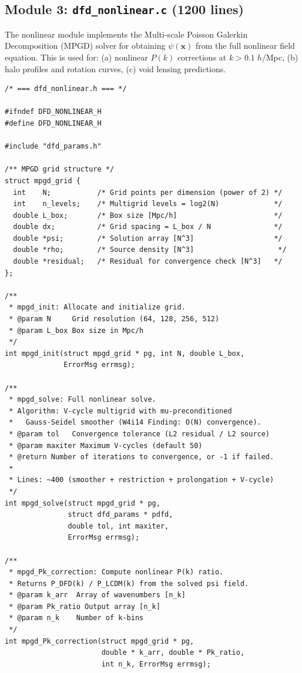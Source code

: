 \documentclass[11pt]{article}
\theoremstyle{definition}
\theoremstyle{remark}
\begin{document}
\subsection{Module 3: \texttt{dfd\_nonlinear.c} (1200 lines)}

The nonlinear module implements the Multi-scale Poisson Galerkin
Decomposition (MPGD) solver for obtaining $\psi(\mathbf{x})$ from
the full nonlinear field equation. This is used for:
(a) nonlinear $P(k)$ corrections at $k > 0.1\;h/$Mpc,
(b) halo profiles and rotation curves,
(c) void lensing predictions.

\begin{lstlisting}[caption={Module 3: Key function signatures}]
/* === dfd_nonlinear.h === */

#ifndef DFD_NONLINEAR_H
#define DFD_NONLINEAR_H

#include "dfd_params.h"

/** MPGD grid structure */
struct mpgd_grid {
  int    N;           /* Grid points per dimension (power of 2) */
  int    n_levels;    /* Multigrid levels = log2(N)             */
  double L_box;       /* Box size [Mpc/h]                       */
  double dx;          /* Grid spacing = L_box / N               */
  double *psi;        /* Solution array [N^3]                   */
  double *rho;        /* Source density [N^3]                    */
  double *residual;   /* Residual for convergence check [N^3]   */
};

/**
 * mpgd_init: Allocate and initialize grid.
 * @param N     Grid resolution (64, 128, 256, 512)
 * @param L_box Box size in Mpc/h
 */
int mpgd_init(struct mpgd_grid * pg, int N, double L_box,
              ErrorMsg errmsg);

/**
 * mpgd_solve: Full nonlinear solve.
 * Algorithm: V-cycle multigrid with mu-preconditioned
 *   Gauss-Seidel smoother (W4i14 Finding: O(N) convergence).
 * @param tol   Convergence tolerance (L2 residual / L2 source)
 * @param maxiter Maximum V-cycles (default 50)
 * @return Number of iterations to convergence, or -1 if failed.
 *
 * Lines: ~400 (smoother + restriction + prolongation + V-cycle)
 */
int mpgd_solve(struct mpgd_grid * pg,
               struct dfd_params * pdfd,
               double tol, int maxiter,
               ErrorMsg errmsg);

/**
 * mpgd_Pk_correction: Compute nonlinear P(k) ratio.
 * Returns P_DFD(k) / P_LCDM(k) from the solved psi field.
 * @param k_arr  Array of wavenumbers [n_k]
 * @param Pk_ratio Output array [n_k]
 * @param n_k    Number of k-bins
 */
int mpgd_Pk_correction(struct mpgd_grid * pg,
                       double * k_arr, double * Pk_ratio,
                       int n_k, ErrorMsg errmsg);


\end{lstlisting}
\end{document}
